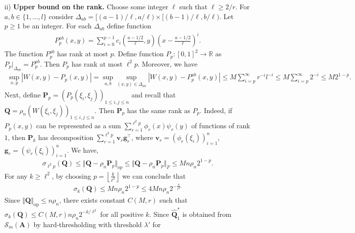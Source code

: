 \documentclass[11pt]{article}
\newcommand{\bbR}{\mathbb{R}}
\newcommand{\op}{\mathrm{op}}
\newcommand{\bA}{\bm{A}}
\newcommand{\bB}{\bm{B}}
\newcommand{\bQ}{\bm{Q}}
\newcommand{\bQhat}{\widehat{\bm{Q}}}
\newcommand{\bv}{\bm{v}}
\newcommand{\bg}{\bm{g}}
\newcommand{\bS}{\bm{S}}
\newcommand{\bP}{\bm{P}}
\newcommand{\<}{\langle}
\renewcommand{\>}{\rangle}
\newcommand{\cS}{\mathcal{S}}
\theoremstyle{plain}
\theoremstyle{definition}
\theoremstyle{remark}
\begin{document}
{ii) \textbf{Upper bound on the rank.} Choose some integer $\ell$ such that $\ell \ge 2 / r$. For $a,b\in \{1,\dots,l\}$ consider $\Delta_{a b} = [(a - 1)/\ell, a/\ell) \times [(b - 1)/\ell, b/\ell)$.  Let  $ p\geq 1$ be an integer.  For each $\Delta_{ab}$  define function
\begin{align*}
	P_p^{ab}(x, y) = \sum_{i = 0}^{p - 1} c_i \left ( \frac{a - 1/2}{\ell}, y \right ) \left (x - \frac{a - 1/2}{\ell} \right )^i.
\end{align*}
The function $P_p^{ab}$ has rank at most $p$.
Define   function $P_p: [0, 1]^2 \to \bbR$ as $P_{p}|_{\Delta_{ab}} = P^{ab}_{p}$.
Then $P_p$ has rank at most $\ell^2 p$. Moreover, we have  
\begin{align*}
	\sup_{x, y} |W(x, y) - P_p(x, y)| = \sup_{a, b} \sup_{(x, y) \in \Delta_{ab}} |W(x, y) - P_p^{ab}(x, y)| \le M \sum_{i = p}^{\infty} r^{-i} l^{-i} \le M \sum_{i = p}^{\infty} 2^{-i}  \le M 2^{1-p}.
\end{align*}
Next, define $\bP_p = (P_p(\xi_i, \xi_j))_{1 \le i, j \le n}$ and recall that $\bQ = \rho_n(W(\xi_i, \xi_j))_{1 \le i, j \le n}$. Then $\bP_p$ has the same rank as $P_p$. Indeed, if $P_p(x, y)$ can be represented as a sum $\sum_{r = 1}^{\ell^2 p} \phi_r(x) \psi_r(y)$ of functions of rank $1$, then $\bP_k$ has decomposition $\sum_{r = 1}^{\ell^2 p} \bv_r \bg_r^\top$, where $\bv_r = (\phi_r(\xi_i))_{i = 1}^n$, $\bg_r = (\psi_r(\xi_i))_{i = 1}^n$. %
We have, 
\begin{align*}
   \sigma_{\ell^2 p}(\bQ) \le \Vert \bQ - \rho_n \bP_p \Vert_{op}\le \Vert \bQ - \rho_n \bP_p \Vert_{F} \le M n \rho_n 2^{1-p}.
\end{align*}
For any $k \ge \ell^2$, by choosing $p = \left \lfloor \frac{k}{\ell^2} \right \rfloor$ we can conclude that 
\begin{align*}
	\sigma_k(\bQ) \le M n \rho_n 2^{1 - p} \leq 4 M n \rho_n 2^{-\frac{k}{\ell^2}.} 
\end{align*}
Since $\Vert \bQ \Vert_{\op} \le n \rho_n$, there exists constant $C(M, r)$ such that $\sigma_k(\bQ) \le C(M, r) n \rho_n 2^{- k/\ell^2}$ for all positive $k$. Since $\bQhat^*_1$ is obtained from $\cS_m(\bA)$ by hard-thresholding with threshold $\lambda'$ for
\begin{align*}

\end{align*}}
\end{document}
